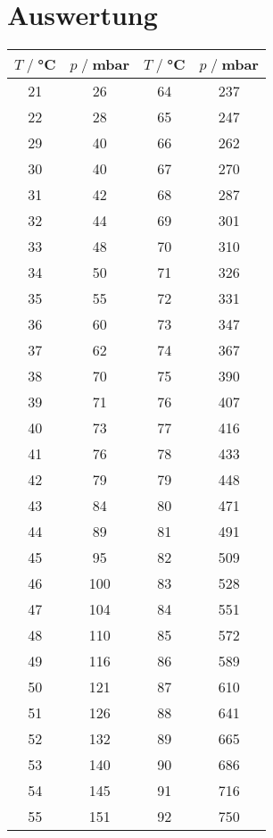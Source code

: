 \newpage
\section{Auswertung}
\label{sec:Auswertung}

\begin{table}
    \centering
    \begin{tabular}{c c || c c}
    \toprule
     $T\;/\;$°C & $p\;/\;$mbar & $T\;/\;$°C & $p\;/\;$mbar\\
    \midrule
    21&      26& 64&      237\\
    22&      28& 65&      247\\
    29&      40& 66&      262\\
    30&      40& 67&      270\\
    31&      42& 68&      287\\
    32&      44& 69&      301\\
    33&      48& 70&      310\\
    34&      50& 71&      326\\
    35&      55& 72&      331\\
    36&      60& 73&      347\\
    37&      62& 74&      367\\
    38&      70& 75&      390\\
    39&      71& 76&      407\\
    40&      73& 77&      416\\
    41&      76& 78&      433\\
    42&      79& 79&      448\\
    43&      84& 80&      471\\
    44&      89& 81&      491\\
    45&      95& 82&      509\\
    46&      100& 83&      528\\
    47&      104& 84&      551\\
    48&      110& 85&      572\\
    49&      116& 86&      589\\
    50&      121& 87&      610\\
    51&      126& 88&      641\\
    52&      132& 89&      665\\
    53&      140& 90&      686\\
    54&      145& 91&      716\\
    55&      151& 92&      750\\

\end{tabular}
\end{table}
